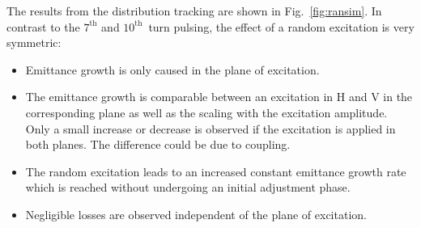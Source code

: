 \documentclass[%
 reprint,
 amsmath,amssymb,
 aps,
prstab,
]{revtex4-1}
\begin{document}
The results from the distribution tracking are shown in Fig.~\ref{fig:ransim}. In contrast to the $7^{\mathrm{th}}$ and $10^{\mathrm{th}}$~turn pulsing, the effect of a random excitation is very symmetric:
\begin{itemize}
	\item Emittance growth is only caused in the plane of excitation.
	\item The emittance growth is comparable between an excitation in H and V in the corresponding plane as well as the scaling with the excitation amplitude. Only a small increase or decrease is observed if the excitation is applied in both planes. The difference could be due to coupling.
	\item The random excitation leads to an increased constant emittance growth rate which is reached without undergoing an initial adjustment phase.
	\item Negligible losses are observed independent of the plane of excitation.
\end{itemize}
\end{document}
